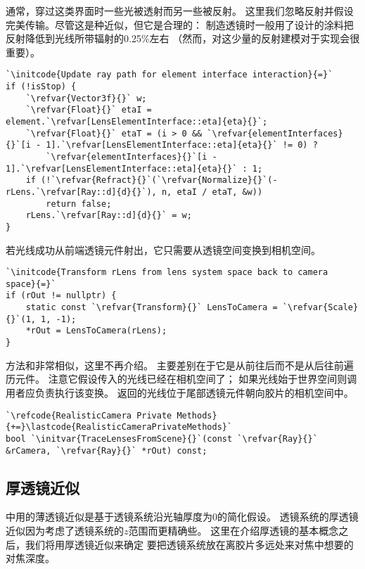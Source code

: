 通常，穿过这类界面时一些光被透射而另一些被反射。
这里我们忽略反射并假设完美传输。尽管这是种近似，但它是合理的：
制造透镜时一般用了设计的涂料把反射降低到光线所带辐射的0.25\%左右
（然而，对这少量的反射建模对于实现会很重要）。
\begin{lstlisting}
`\initcode{Update ray path for element interface interaction}{=}`
if (!isStop) {
    `\refvar{Vector3f}{}` w;
    `\refvar{Float}{}` etaI = element.`\refvar[LensElementInterface::eta]{eta}{}`;
    `\refvar{Float}{}` etaT = (i > 0 && `\refvar{elementInterfaces}{}`[i - 1].`\refvar[LensElementInterface::eta]{eta}{}` != 0) ?
        `\refvar{elementInterfaces}{}`[i - 1].`\refvar[LensElementInterface::eta]{eta}{}` : 1;
    if (!`\refvar{Refract}{}`(`\refvar{Normalize}{}`(-rLens.`\refvar[Ray::d]{d}{}`), n, etaI / etaT, &w))
        return false;
    rLens.`\refvar[Ray::d]{d}{}` = w;
}
\end{lstlisting}

若光线成功从前端透镜元件射出，它只需要从透镜空间变换到相机空间。
\begin{lstlisting}
`\initcode{Transform rLens from lens system space back to camera space}{=}`
if (rOut != nullptr) {
    static const `\refvar{Transform}{}` LensToCamera = `\refvar{Scale}{}`(1, 1, -1);
    *rOut = LensToCamera(rLens);
}
\end{lstlisting}

方法和非常相似，这里不再介绍。
主要差别在于它是从前往后而不是从后往前遍历元件。
注意它假设传入的光线已经在相机空间了；
如果光线始于世界空间则调用者应负责执行该变换。
返回的光线位于尾部透镜元件朝向胶片的相机空间中。
\begin{lstlisting}
`\refcode{RealisticCamera Private Methods}{+=}\lastcode{RealisticCameraPrivateMethods}`
bool `\initvar{TraceLensesFromScene}{}`(const `\refvar{Ray}{}` &rCamera, `\refvar{Ray}{}` *rOut) const;
\end{lstlisting}

\subsection{厚透镜近似}\label{sub:厚透镜近似}
中用的薄透镜近似是基于透镜系统沿光轴厚度为0的简化假设。
透镜系统的厚透镜近似因为考虑了透镜系统的$z$范围而更精确些。
这里在介绍厚透镜的基本概念之后，我们将用厚透镜近似来确定
要把透镜系统放在离胶片多远处来对焦中想要的对焦深度。

